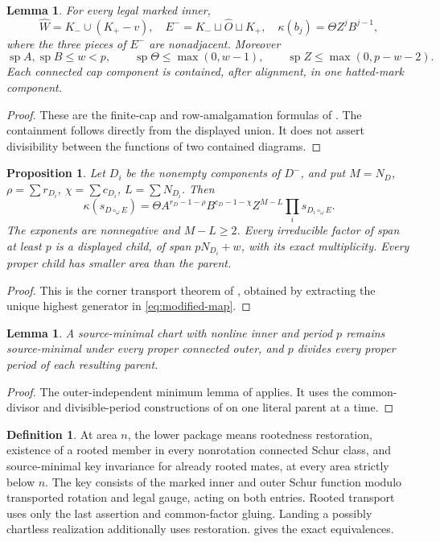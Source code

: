 \documentclass[11pt,a4paper]{amsart}
\numberwithin{equation}{section}
\theoremstyle{plain}
\newtheorem{proposition}[theorem]{Proposition}
\newtheorem{lemma}[theorem]{Lemma}
\theoremstyle{definition}
\newtheorem{definition}[theorem]{Definition}
\begin{document}
\begin{lemma}\label{lem:finite-caps}
For every legal marked inner,
\[
 \widehat W=K_-\cup(K_+-v),\quad E^-=K_-\sqcup\widehat O\sqcup K_+,
 \quad\kappa(b_j)=\Theta Z^jB^{j-1},
\]
where the three pieces of \(E^-\) are nonadjacent.  Moreover
\[
 \operatorname{sp}A,\operatorname{sp}B\le w<p,\qquad
 \operatorname{sp}\Theta\le\max(0,w-1),\qquad
 \operatorname{sp}Z\le\max(0,p-w-2).
\]
Each connected cap component is contained, after alignment, in one hatted-mark component.
\end{lemma}
\begin{proof}
These are the finite-cap and row-amalgamation formulas of \cite{Shields2026CornerDescent}.  The containment follows directly from the displayed union.  It does not assert divisibility between the functions of two contained diagrams.
\end{proof}

\begin{proposition}\label{thm:corner-transport}
Let \(D_i\) be the nonempty components of \(D^-\), and put \(M=N_D\), \(\rho=\sum r_{D_i}\), \(\chi=\sum c_{D_i}\), \(L=\sum N_{D_i}\).  Then
\[
 \kappa(s_{D\circ_\omega E})=
 \Theta A^{r_D-1-\rho}B^{c_D-1-\chi}Z^{M-L}
 \prod_i s_{D_i\circ_\omega E}.
\]
The exponents are nonnegative and \(M-L\ge2\).  Every irreducible factor of span at least \(p\) is a displayed child, of span \(pN_{D_i}+w\), with its exact multiplicity.  Every proper child has smaller area than the parent.
\end{proposition}
\begin{proof}
This is the corner transport theorem of \cite{Shields2026CornerDescent}, obtained by extracting the unique highest generator in \eqref{eq:modified-map}.
\end{proof}

\begin{lemma}\label{lem:outer-minimal}
A source-minimal chart with nonline inner and period \(p\) remains source-minimal under every proper connected outer, and \(p\) divides every proper period of each resulting parent.
\end{lemma}
\begin{proof}
The outer-independent minimum lemma of \cite{Shields2026CornerDescent} applies.  It uses the common-divisor and divisible-period constructions of \cite{Shields2026Gluing} on one literal parent at a time.
\end{proof}

\begin{definition}\label{def:lower-package}
At area \(n\), the lower package means rootedness restoration, existence of a rooted member in every nonrotation connected Schur class, and source-minimal key invariance for already rooted mates, at every area strictly below \(n\).  The key consists of the marked inner and outer Schur function modulo transported rotation and legal gauge, acting on both entries.  Rooted transport uses only the last assertion and common-factor gluing.  Landing a possibly chartless realization additionally uses restoration.   gives the exact equivalences.
\end{definition}
\end{document}
